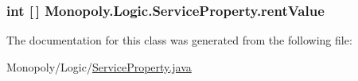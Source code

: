 \subsubsection[{\texorpdfstring{rent\+Value}{rentValue}}]{\setlength{\rightskip}{0pt plus 5cm}int \mbox{[}$\,$\mbox{]} Monopoly.\+Logic.\+Service\+Property.\+rent\+Value\hspace{0.3cm}{\ttfamily [private]}}\hypertarget{class_monopoly_1_1_logic_1_1_service_property_ab03c954de837e6c827ed4646170ffbb9}{}\label{class_monopoly_1_1_logic_1_1_service_property_ab03c954de837e6c827ed4646170ffbb9}


The documentation for this class was generated from the following file\+:\begin{DoxyCompactItemize}
\item 
Monopoly/\+Logic/\hyperlink{_service_property_8java}{Service\+Property.\+java}\end{DoxyCompactItemize}
